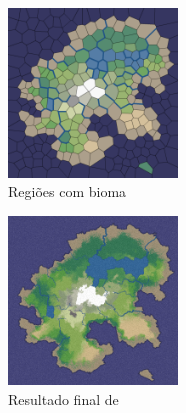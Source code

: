 \begin{figure}[H]
    \captionsetup{justification=raggedright, singlelinecheck=false}
    \centering
    \includegraphics[width=0.4\textwidth]{figuras/patel2010biomes.png}
    \caption{Regiões com bioma}
    \label{fig:patel2010biomes}
\end{figure}

\begin{figure}[H]
    \captionsetup{justification=raggedright, singlelinecheck=false}
    \centering
    \includegraphics[width=0.4\textwidth]{figuras/voronoi-map-goal-distorted.png}
    \caption{Resultado final de \cite{patel2010polygonal}}
    \label{fig:voronoi-map-goal-distorted}
\end{figure}





%
